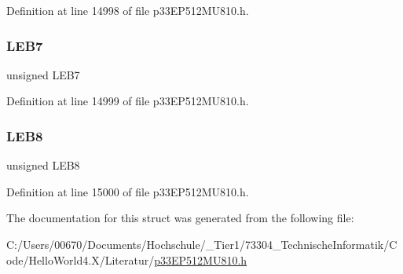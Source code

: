 Definition at line 14998 of file p33\+E\+P512\+M\+U810.\+h.

\mbox{\label{structtag_l_e_b_d_l_y4_b_i_t_s_aa76d586b04119d8459718019ddd964ef}} 
\subsubsection{\texorpdfstring{L\+E\+B7}{LEB7}}
{\footnotesize\ttfamily unsigned L\+E\+B7}



Definition at line 14999 of file p33\+E\+P512\+M\+U810.\+h.

\mbox{\label{structtag_l_e_b_d_l_y4_b_i_t_s_a9b22b47001301c6ae00c3eea0f385091}} 
\subsubsection{\texorpdfstring{L\+E\+B8}{LEB8}}
{\footnotesize\ttfamily unsigned L\+E\+B8}



Definition at line 15000 of file p33\+E\+P512\+M\+U810.\+h.



The documentation for this struct was generated from the following file\+:\begin{DoxyCompactItemize}
\item 
C\+:/\+Users/00670/\+Documents/\+Hochschule/\+\_\+\+Tier1/73304\+\_\+\+Technische\+Informatik/\+Code/\+Hello\+World4.\+X/\+Literatur/\hyperlink{p33_e_p512_m_u810_8h}{p33\+E\+P512\+M\+U810.\+h}\end{DoxyCompactItemize}
